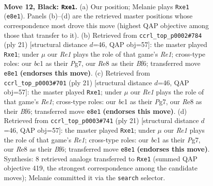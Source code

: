 \documentclass[11pt]{article}
\begin{document}
\clearpage

\begin{figure}[p]\centering
\begin{subfigure}{0.46\textwidth}\centering
\resizebox{\linewidth}{!}{%
\newchessgame
\chessboard[
  setfen={r1bqr1k1/pppp1p1p/3n1bp1/8/8/1PN2P2/P1PP2PP/R1BQRBK1 b - - 0 12},
  showmover=false,
  pgfstyle=straightmove, color=movearrow, markmove={e8-e1}
]}
\caption{}
\end{subfigure}\hfill
\begin{subfigure}{0.46\textwidth}\centering
\resizebox{\linewidth}{!}{%
\newchessgame
\chessboard[
  setfen={r1bqr1k1/pppp1ppp/3n1b2/8/3P4/2P5/PP3PPP/RNBQRBK1 b - - 0 11},
  showmover=false,
  pgfstyle=straightmove, color=movearrow, markmove={e8-e1}
]}
\caption{}
\end{subfigure}
\\[4pt]
\begin{subfigure}{0.46\textwidth}\centering
\resizebox{\linewidth}{!}{%
\newchessgame
\chessboard[
  setfen={r1bqr1k1/pppp1ppp/3n1b2/8/3P4/2P5/PP3PPP/RNBQRBK1 b - - 0 11},
  showmover=false,
  pgfstyle=straightmove, color=movearrow, markmove={e8-e1}
]}
\caption{}
\end{subfigure}\hfill
\begin{subfigure}{0.46\textwidth}\centering
\resizebox{\linewidth}{!}{%
\newchessgame
\chessboard[
  setfen={r1bqr1k1/pppp1ppp/3n1b2/8/3P4/2P5/PP3PPP/RNBQRBK1 b - - 0 11},
  showmover=false,
  pgfstyle=straightmove, color=movearrow, markmove={e8-e1}
]}
\caption{}
\end{subfigure}
\caption{\textbf{Move 12, Black: \texttt{Rxe1}.} (a) Our position; Melanie plays \texttt{Rxe1} (\texttt{e8e1}). Panels (b)--(d) are the retrieved master positions whose correspondence most drove this move (highest QAP objective among those that transfer to it). (b) Retrieved from \texttt{ccrl\_top\_p0002\#784} (ply 21) [structural distance $d$=46, QAP obj=57]: the master played \texttt{Rxe1}; under $\mu$ our \emph{Re1} plays the role of that game's \emph{Re1}; cross-type roles: our \emph{b}c1 as their \emph{P}g7, our \emph{R}e8 as their \emph{B}f6; transferred move \texttt{e8e1} \textbf{(endorses this move)}. (c) Retrieved from \texttt{ccrl\_top\_p0003\#701} (ply 21) [structural distance $d$=46, QAP obj=57]: the master played \texttt{Rxe1}; under $\mu$ our \emph{Re1} plays the role of that game's \emph{Re1}; cross-type roles: our \emph{b}c1 as their \emph{P}g7, our \emph{R}e8 as their \emph{B}f6; transferred move \texttt{e8e1} \textbf{(endorses this move)}. (d) Retrieved from \texttt{ccrl\_top\_p0003\#741} (ply 21) [structural distance $d$=46, QAP obj=57]: the master played \texttt{Rxe1}; under $\mu$ our \emph{Re1} plays the role of that game's \emph{Re1}; cross-type roles: our \emph{b}c1 as their \emph{P}g7, our \emph{R}e8 as their \emph{B}f6; transferred move \texttt{e8e1} \textbf{(endorses this move)}. Synthesis: 8 retrieved analogs transferred to \texttt{Rxe1} (summed QAP objective 419, the strongest correspondence among the candidate moves); Melanie committed it via the \texttt{search} selector.}
\label{fig:thought-m23}
\end{figure}
\end{document}
